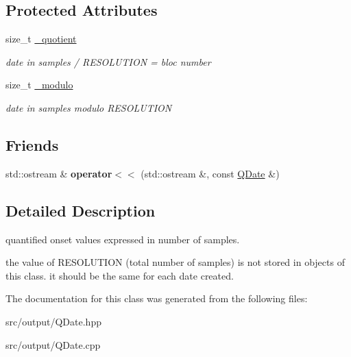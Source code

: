 \subsection*{Protected Attributes}
\begin{DoxyCompactItemize}
\item 
\mbox{\label{classQDate_ae3c7801be338e952050f037c7cc4c799}} 
size\+\_\+t \mbox{\hyperlink{classQDate_ae3c7801be338e952050f037c7cc4c799}{\+\_\+quotient}}
\begin{DoxyCompactList}\small\item\em date in samples / R\+E\+S\+O\+L\+U\+T\+I\+ON = bloc number \end{DoxyCompactList}\item 
\mbox{\label{classQDate_ad14e1214b142bb77fa92e7f2b80f927c}} 
size\+\_\+t \mbox{\hyperlink{classQDate_ad14e1214b142bb77fa92e7f2b80f927c}{\+\_\+modulo}}
\begin{DoxyCompactList}\small\item\em date in samples modulo R\+E\+S\+O\+L\+U\+T\+I\+ON \end{DoxyCompactList}\end{DoxyCompactItemize}
\subsection*{Friends}
\begin{DoxyCompactItemize}
\item 
\mbox{\label{classQDate_ad9fd1ed50658c87da7aa8b5009154b47}} 
std\+::ostream \& {\bfseries operator$<$$<$} (std\+::ostream \&, const \mbox{\hyperlink{classQDate}{Q\+Date}} \&)
\end{DoxyCompactItemize}


\subsection{Detailed Description}
quantified onset values expressed in number of samples. 

the value of R\+E\+S\+O\+L\+U\+T\+I\+ON (total number of samples) is not stored in objects of this class. it should be the same for each date created. 

The documentation for this class was generated from the following files\+:\begin{DoxyCompactItemize}
\item 
src/output/Q\+Date.\+hpp\item 
src/output/Q\+Date.\+cpp\end{DoxyCompactItemize}
